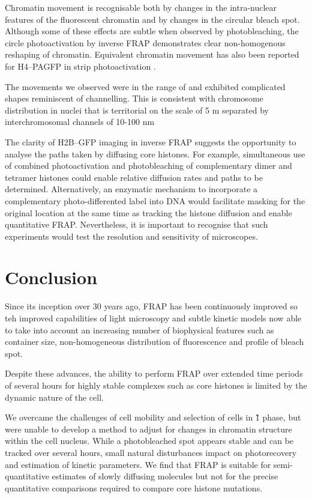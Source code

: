     Chromatin movement is recognisable both 
    by changes in the intra-nuclear features of the fluorescent chromatin 
    and by changes in the circular bleach spot.
    Although some of these effects are subtle when observed by photobleaching,
    the circle photoactivation by inverse FRAP demonstrates 
    clear non-homogenous reshaping of chromatin.
    Equivalent chromatin movement has also been reported 
    for H4--PAGFP in strip photoactivation \cite{H4PAGFP-chromatin-movement}.

    The movements we observed were in the range of  
    and exhibited complicated shapes reminiscent of channelling.
    This is consistent with chromosome distribution in nuclei that is 
    territorial on the scale of 5 \textmu m  
    separated by interchromosomal channels of 10-100 nm 
    
    The clarity of H2B--GFP imaging in inverse FRAP suggests the opportunity to analyse the 
    paths taken by diffusing core histones. 
    For example, simultaneous use of combined photoactivation and photobleaching 
    of complementary dimer and tetramer histones could 
    enable relative diffusion rates and paths to be determined.
    Alternatively, an enzymatic mechanism to incorporate a 
    complementary photo-differented label into DNA  would facilitate masking for 
    the original location at the same time as tracking the histone diffusion
    and enable quantitative FRAP.
    Nevertheless, it is important to recognise that such experiments would test the 
    resolution and sensitivity of microscopes.

\section{Conclusion}

    Since its inception over 30 years ago, FRAP has been continuously improved
    so teh improved capabilities of light microscopy
    and subtle kinetic models now able to take into account
    an increasing number of biophysical features such as container size, 
    non-homogeneous distribution of fluorescence and profile of bleach spot.

    Despite these advances, the ability to perform FRAP
    over extended time periods of several hours for highly stable complexes
    such as core histones is limited by the dynamic nature of the cell.

    We overcame the challenges of cell mobility and selection of cells in \G1{} phase,
    but were unable to develop a method to adjust for changes in chromatin structure within the cell nucleus.
    While a photobleached spot appears stable and can be tracked over several hours, 
    small natural disturbances impact on photorecovery and estimation of kinetic parameters.
    We find that FRAP is suitable for semi-quantitative estimates of slowly diffusing molecules
    but not for the precise quantitative comparisons required to compare core histone mutations.


